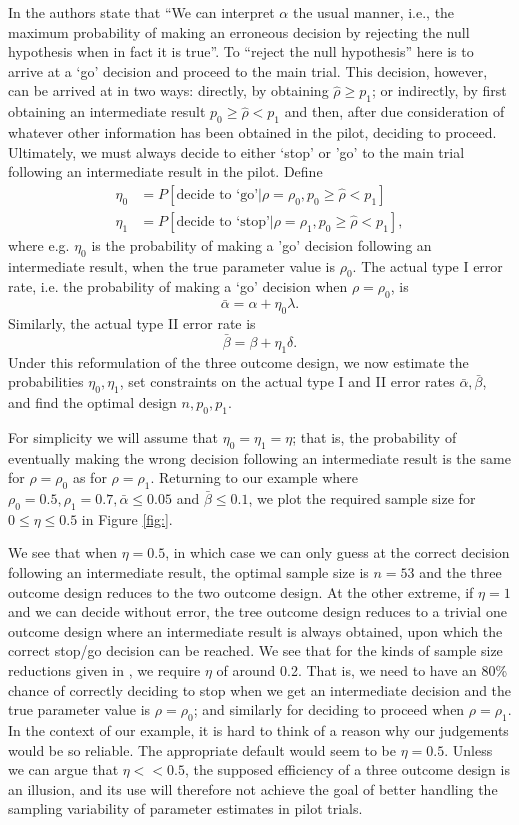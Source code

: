 \documentclass[sagev, Crown]{sagej} %
\begin{document}
In \cite{Sargent2001} the authors state that ``We  can interpret $\alpha$  the usual  manner,  i.e., the  maximum probability of making an erroneous decision by rejecting the null hypothesis when in fact it is true''. To ``reject the null hypothesis'' here is to arrive at a `go' decision and proceed to the main trial. This decision, however, can be arrived at in two ways: directly, by obtaining $\hat{\rho} \geq p_1$; or indirectly, by first obtaining an intermediate result $p_0 \geq \hat{\rho} < p_1$ and then, after due consideration of whatever other information has been obtained in the pilot, deciding to proceed. Ultimately, we must always decide to either `stop' or 'go' to the main trial following an intermediate result in the pilot. Define
\begin{align}
\eta_0 &= P[\text{decide to `go'} | \rho = \rho_0, p_0 \geq \hat{\rho} < p_1] \\
\eta_1 &= P[\text{decide to `stop'} | \rho = \rho_1, p_0 \geq \hat{\rho} < p_1],
\end{align}
where e.g.  $\eta_0$ is the probability of making a 'go' decision following an intermediate result, when the true parameter value is $\rho_0$. The actual type I error rate, i.e. the probability of making a `go' decision when $\rho = \rho_0$, is
$$
\bar{\alpha} = \alpha + \eta_0 \lambda.
$$
Similarly, the actual type II error rate is
$$
\bar{\beta} = \beta + \eta_1 \delta.
$$
Under this reformulation of the three outcome design, we now estimate the probabilities $\eta_0, \eta_1$, set constraints on the actual type I and II error rates $\bar{\alpha}, \bar{\beta}$, and find the optimal design $n, p_0, p_1$. 

For simplicity we will assume that $\eta_0 = \eta_1 = \eta$; that is, the probability of eventually making the wrong decision following an intermediate result is the same for $\rho = \rho_0$ as for $\rho = \rho_1$. Returning to our example where $\rho_0 = 0.5, \rho_1 = 0.7, \bar{\alpha} \leq 0.05$ and $\bar{\beta} \leq 0.1$, we plot the required sample size for $0 \leq \eta \leq 0.5$ in Figure \ref{fig:}. 

We see that when $\eta = 0.5$, in which case we can only guess at the correct decision following an intermediate result, the optimal sample size is $n = 53$ and the three outcome design reduces to the two outcome design. At the other extreme, if $\eta = 1$ and we can decide without error, the tree outcome design reduces to a trivial one outcome design where an intermediate result is always obtained, upon which the correct stop/go decision can be reached. We see that for the kinds of sample size reductions given in \cite{Sargent2001}, we require $\eta$ of around 0.2. That is, we need to have an 80\% chance of correctly deciding to stop when we get an intermediate decision and the true parameter value is $\rho = \rho_0$; and similarly for deciding to proceed when $\rho = \rho_1$. In the context of our example, it is hard to think of a reason why our judgements would be so reliable. The appropriate default would seem to be $\eta = 0.5$. Unless we can argue that $\eta << 0.5$, the supposed efficiency of a three outcome design is an illusion, and its use will therefore not achieve the goal of better handling the sampling variability of parameter estimates in pilot trials.
\end{document}
